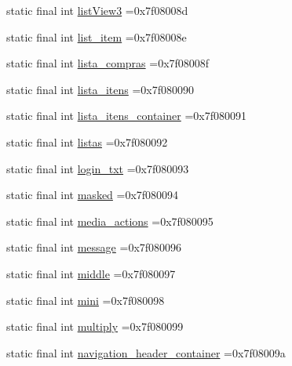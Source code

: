 \begin{DoxyCompactItemize}
static final int \mbox{\hyperlink{classbr_1_1unb_1_1cic_1_1mp_1_1marketmaster_1_1R_1_1id_af084b388f35598006cafa8f22f430cfc}{list\+View3}} =0x7f08008d
\item 
static final int \mbox{\hyperlink{classbr_1_1unb_1_1cic_1_1mp_1_1marketmaster_1_1R_1_1id_a601805f77dcc025384c29414d4b8c494}{list\+\_\+item}} =0x7f08008e
\item 
static final int \mbox{\hyperlink{classbr_1_1unb_1_1cic_1_1mp_1_1marketmaster_1_1R_1_1id_a7a6fd297f11571740af7d8d1b0b1e030}{lista\+\_\+compras}} =0x7f08008f
\item 
static final int \mbox{\hyperlink{classbr_1_1unb_1_1cic_1_1mp_1_1marketmaster_1_1R_1_1id_a3da250fbe6f099bc33a02704fc5e515f}{lista\+\_\+itens}} =0x7f080090
\item 
static final int \mbox{\hyperlink{classbr_1_1unb_1_1cic_1_1mp_1_1marketmaster_1_1R_1_1id_a5987f5122a3f6b179db9b0dec2b0aa06}{lista\+\_\+itens\+\_\+container}} =0x7f080091
\item 
static final int \mbox{\hyperlink{classbr_1_1unb_1_1cic_1_1mp_1_1marketmaster_1_1R_1_1id_aec92247972308c4ce7eb467440b496fb}{listas}} =0x7f080092
\item 
static final int \mbox{\hyperlink{classbr_1_1unb_1_1cic_1_1mp_1_1marketmaster_1_1R_1_1id_aebc7704e8d4a6f321a51e504e9381505}{login\+\_\+txt}} =0x7f080093
\item 
static final int \mbox{\hyperlink{classbr_1_1unb_1_1cic_1_1mp_1_1marketmaster_1_1R_1_1id_ab86cc6c0b140631dbbc17e31ff3a7772}{masked}} =0x7f080094
\item 
static final int \mbox{\hyperlink{classbr_1_1unb_1_1cic_1_1mp_1_1marketmaster_1_1R_1_1id_af04143096e27436d28dd155b52b45a1a}{media\+\_\+actions}} =0x7f080095
\item 
static final int \mbox{\hyperlink{classbr_1_1unb_1_1cic_1_1mp_1_1marketmaster_1_1R_1_1id_af51d8d46e829a8e365a5bc0e125777df}{message}} =0x7f080096
\item 
static final int \mbox{\hyperlink{classbr_1_1unb_1_1cic_1_1mp_1_1marketmaster_1_1R_1_1id_a3aa0b811e584875f86dfe559c6306d59}{middle}} =0x7f080097
\item 
static final int \mbox{\hyperlink{classbr_1_1unb_1_1cic_1_1mp_1_1marketmaster_1_1R_1_1id_a1fcd7b1971e83a5aaf1201997c9117d9}{mini}} =0x7f080098
\item 
static final int \mbox{\hyperlink{classbr_1_1unb_1_1cic_1_1mp_1_1marketmaster_1_1R_1_1id_a2dd4a4c29c57900b0d53f073e2be786b}{multiply}} =0x7f080099
\item 
static final int \mbox{\hyperlink{classbr_1_1unb_1_1cic_1_1mp_1_1marketmaster_1_1R_1_1id_a9d3069ee868b77da1742ce21b4be86ea}{navigation\+\_\+header\+\_\+container}} =0x7f08009a

\end{DoxyCompactItemize}
